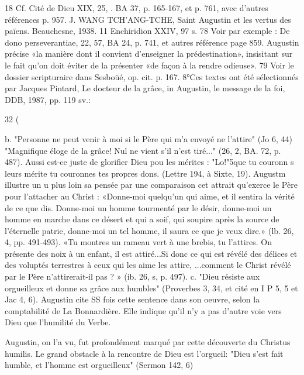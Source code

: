 18 Cf. Cité de Dieu XIX, 25, . BA 37, p. 165-167, et p. 761, avec d'autres références p. 957. J. WANG TCH'ANG-TCHE, Saint Augustin et les vertus des païens. Beauchesne, 1938.
11 Enchiridion XXIV, 97 s.
78 Voir par exemple : De dono perseverantiae, 22, 57, BA 24, p. 741, et autres référence page 859. Augustin précise «la manière dont il convient d'enseigner la prédestination», insisitant sur le fait qu'on doit éviter de la présenter «de façon à la rendre odieuse».
79 Voir le dossier scripturaire dans Sesboüé, op. cit. p. 167.
8°Ces textes ont été sélectionnés par Jacques Pintard, Le docteur de la grâce, in Augustin, le
message de la foi, DDB, 1987, pp. 119 sv.:


32
(
 
b.	"Personne ne peut venir à moi si le Père qui m'a envoyé ne l'attire" (Jo 6, 44) "Magnifique éloge de la grâce! Nul ne vient s'il n'est tiré..." (26, 2, BA. 72, p. 487). Aussi est-ce juste de glorifier Dieu pou les mérites : "Lo!"5que tu couronn s leurs mérite tu couronnes tes propres dons. (Lettre 194, à Sixte, 19). Augustm illustre un u plus loin sa pensée par une comparaison cet attrait qu'exerce le Père
pour l'attacher au Christ :
«Donne-moi quelqu'un qui aime, et il sentira la vérité de ce que dis. Donne-moi un homme tourmenté par le désir, donne-moi un homme en marche dans ce désert et qui a soif, qui soupire après la source de l'éternelle patrie, donne-moi un tel homme, il saura ce que je veux dire.» (lb. 26, 4, pp. 491-493).
«Tu montres  un rameau vert à une brebis, tu l'attires. On présente des noix à
un enfant, il est attiré...Si donc ce qui est révélé des délices et des voluptés terrestres à ceux qui les aime les attire, ...comment le Christ révélé par le Père n'attirerait-il pas ? » (ib. 26, s, p. 497).
c.	"Dieu résiste aux orgueilleux et donne sa grâce aux humbles" (Proverbes 3, 34, et cité en I P 5, 5 et Jac 4, 6). Augustin cite SS fois cette sentence dans son oeuvre, selon la comptabilité de La Bonnardière. Elle indique qu'il n'y a pas d'autre voie vers Dieu que l'humilité du Verbe.

Augustin, on l'a vu, fut profondément marqué par cette découverte du Christus humilis. Le grand obstacle à la rencontre de Dieu est l'orgueil: "Dieu s'est fait humble, et l'homme est orgueilleux" (Sermon 142, 6)

